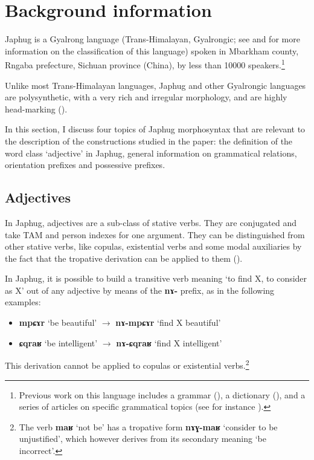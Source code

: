 \documentclass[oneside,a4paper,11pt]{article}
\newcommand{\ipa}[1]{{\phon\textbf{#1}}} %
\begin{document}
\section{Background information} \label{sec:background}
Japhug is a Gyalrong language (Trans-Himalayan, Gyalrongic; see \citealt{jackson00sidaba} and \citealt{jacques.michaud11naish} for more information on the classification of this language) spoken in Mbarkham county, Rngaba prefecture, Sichuan province (China), by less than 10000 speakers.\footnote{Previous work on this language includes a grammar (\citealt{jacques08}), a dictionary (\citealt{jacques15japhug}), and a series of articles on specific grammatical topics (see for instance \citealt{jacques13harmonization, jacques14linking, jacques16relatives}). } 


Unlike most Trans-Himalayan languages, Japhug and other Gyalrongic languages are polysynthetic, with a very rich and irregular morphology, and are highly head-marking (\citealt{jacques13harmonization, jackson14morpho}).

In this section, I discuss four topics of Japhug morphosyntax that are relevant to the description of the constructions studied in the paper: the definition of the word class `adjective' in Japhug, general information on grammatical relations, orientation prefixes and possessive prefixes.


\subsection{Adjectives}
In Japhug, adjectives are a sub-class of stative verbs. They are conjugated and take TAM and person indexes for one argument. They can be distinguished from other stative verbs, like copulas, existential verbs and some modal auxiliaries by the fact that the tropative derivation can be applied to them (\citealt{jacques13tropative}).

In Japhug, it is possible to build a transitive verb meaning `to find X, to consider as X' out of any adjective by means of the \ipa{nɤ-} prefix, as in the following examples:

\begin{itemize}
\item \ipa{mpɕɤr} `be beautiful' $\rightarrow$ \ipa{nɤ-mpɕɤr} `find X beautiful'
\item \ipa{ɕqraʁ} `be intelligent' $\rightarrow$ \ipa{nɤ-ɕqraʁ} `find X intelligent'
\end{itemize}

This derivation cannot be applied to copulas or existential verbs.\footnote{The verb \ipa{maʁ} `not be' has a tropative form \ipa{nɤɣ-maʁ} `consider to be unjustified', which however derives from its secondary meaning `be incorrect'.} 
\end{document}
